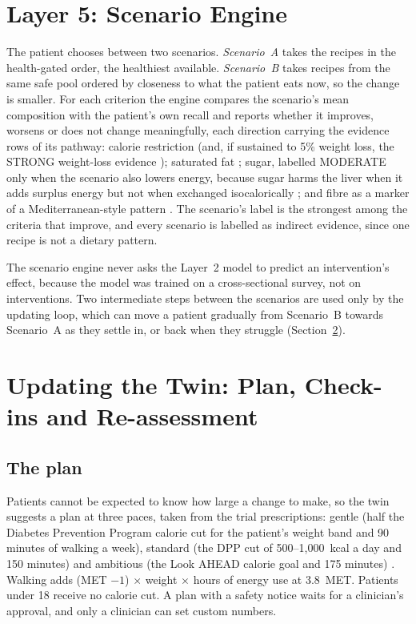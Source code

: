 \section{Layer 5: Scenario Engine}
\label{sec:m_layer5}

The patient chooses between two scenarios. \emph{Scenario~A} takes the
recipes in the health-gated order, the healthiest available.
\emph{Scenario~B} takes recipes from the same safe pool ordered by closeness
to what the patient eats now, so the change is smaller. For each criterion
the engine compares the scenario's mean composition with the patient's own
recall and reports whether it improves, worsens or does not change
meaningfully, each direction carrying the evidence rows of its pathway:
calorie restriction (and, if sustained to 5\% weight loss, the STRONG
weight-loss evidence \cite{vilargomez2015weight}); saturated fat
\cite{luukkonen2018saturated}; sugar, labelled MODERATE only when the scenario
also lowers energy, because sugar harms the liver when it adds surplus energy
but not when exchanged isocalorically \cite{chiu2014fructose}; and fibre as a
marker of a Mediterranean-style pattern \cite{haigh2022mediterranean}. The
scenario's label is the strongest among the criteria that improve, and every
scenario is labelled as indirect evidence, since one recipe is not a dietary
pattern.

The scenario engine never asks the Layer~2 model to predict an intervention's
effect, because the model was trained on a cross-sectional survey, not on
interventions. Two intermediate steps between the scenarios are used only by
the updating loop, which can move a patient gradually from Scenario~B
towards Scenario~A as they settle in, or back when they struggle
(Section~\ref{sec:m_update}).

\section{Updating the Twin: Plan, Check-ins and Re-assessment}
\label{sec:m_update}

\subsection{The plan}

Patients cannot be expected to know how large a change to make, so the twin
suggests a plan at three paces, taken from the trial prescriptions: gentle
(half the Diabetes Prevention Program calorie cut for the patient's weight
band and 90 minutes of walking a week), standard (the DPP cut of
500--1{,}000~kcal a day and 150 minutes) \cite{dpp2002lifestyle} and ambitious
(the Look AHEAD calorie goal and 175 minutes) \cite{lookahead2006intervention}.
Walking adds (MET $-1$) $\times$ weight $\times$ hours of energy use at 3.8~MET.
Patients under 18 receive no calorie cut. A plan with a safety notice waits
for a clinician's approval, and only a clinician can set custom numbers.

